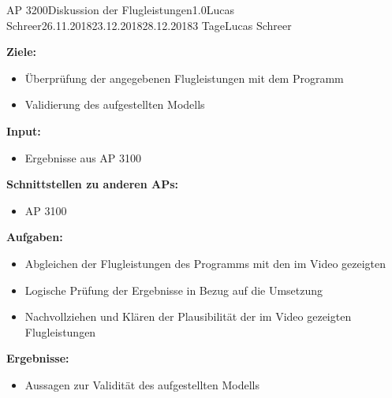 \begin{appendix}
\clearpage
\begin{wpd}{AP 3200}{Diskussion der Flugleistungen}{1.0}{Lucas Schreer}{26.11.2018}{23.12.2018}{28.12.2018}{3 Tage}{Lucas Schreer}
    {
    \textbf{Ziele:}
    \begin{itemize}
        \item Überprüfung der angegebenen Flugleistungen mit dem Programm
        \item Validierung des aufgestellten Modells
    \end{itemize}
    \textbf{Input:}
    \begin{itemize}
        \item Ergebnisse aus AP 3100
    \end{itemize}
    \textbf{Schnittstellen zu anderen APs:}
    \begin{itemize}
        \item AP 3100
    \end{itemize}
    \textbf{Aufgaben:}
    \begin{itemize}
        \item Abgleichen der Flugleistungen des Programms mit den im Video gezeigten
        \item Logische Prüfung der Ergebnisse in Bezug auf die Umsetzung
        \item Nachvollziehen und Klären der Plausibilität der im Video gezeigten Flugleistungen
    \end{itemize}
    \textbf{Ergebnisse:}
    \begin{itemize}
        \item Aussagen zur Validität des aufgestellten Modells
    \end{itemize}
    }
\end{wpd}



\end{appendix}
